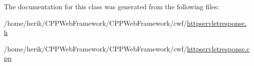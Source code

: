 The documentation for this class was generated from the following files\+:\begin{DoxyCompactItemize}
\item 
/home/herik/\+C\+P\+P\+Web\+Framework/\+C\+P\+P\+Web\+Framework/cwf/\hyperlink{httpservletresponse_8h}{httpservletresponse.\+h}\item 
/home/herik/\+C\+P\+P\+Web\+Framework/\+C\+P\+P\+Web\+Framework/cwf/\hyperlink{httpservletresponse_8cpp}{httpservletresponse.\+cpp}\end{DoxyCompactItemize}
